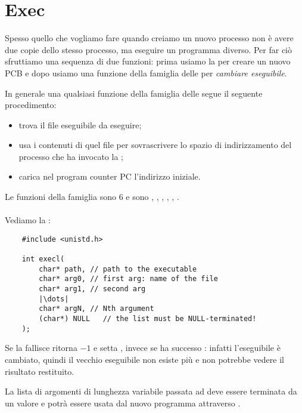 \section{Exec}

Spesso quello che vogliamo fare quando creiamo un nuovo processo non è avere due copie dello stesso processo, ma eseguire un programma diverso. 
Per far ciò sfruttiamo una sequenza di due funzioni:
prima usiamo la  per creare un nuovo \textsf{PCB} e dopo usiamo una funzione della famiglia delle  per \emph{cambiare eseguibile}.

In generale una qualsiasi funzione della famiglia delle  segue il seguente procedimento:
\begin{itemize}
    \item trova il file eseguibile da eseguire;
    \item usa i contenuti di quel file per sovrascrivere lo spazio di indirizzamento del processo che ha invocato la ;
    \item carica nel program counter \textsf{PC} l'indirizzo iniziale.
\end{itemize}

Le funzioni della famiglia  sono $6$ e sono , , , , , .

\paragraph{}
Vediamo la :
\begin{verbatim}
    #include <unistd.h>

    int execl(
        char* path, // path to the executable
        char* arg0, // first arg: name of the file
        char* arg1, // second arg
        |\dots|
        char* argN, // Nth argument
        (char*) NULL   // the list must be NULL-terminated! 
    );
\end{verbatim}

Se la  fallisce ritorna $-1$ e setta , invece se ha successo : infatti l'eseguibile è cambiato, quindi il vecchio eseguibile non esiste più e non potrebbe vedere il risultato restituito.

La lista di argomenti di lunghezza variabile passata ad  deve essere terminata da un valore  e potrà essere usata dal nuovo programma attraverso .

